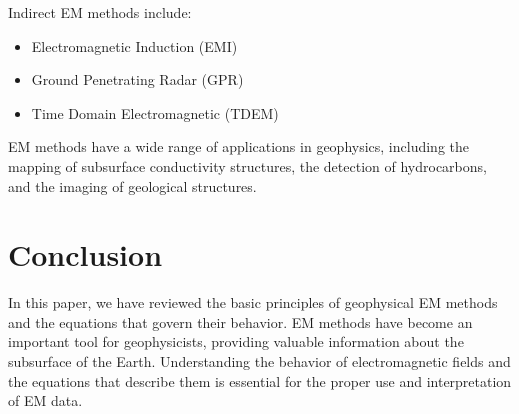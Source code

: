 \documentclass{article}
\begin{document}
Indirect EM methods include:
\begin{itemize}
\item Electromagnetic Induction (EMI)
\item Ground Penetrating Radar (GPR)
\item Time Domain Electromagnetic (TDEM)
\end{itemize}

EM methods have a wide range of applications in geophysics, including the mapping of subsurface conductivity structures, the detection of hydrocarbons, and the imaging of geological structures.

\section{Conclusion}
In this paper, we have reviewed the basic principles of geophysical EM methods and the equations that govern their behavior. EM methods have become an important tool for geophysicists, providing valuable information about the subsurface of the Earth. Understanding the behavior of electromagnetic fields and the equations that describe them is essential for the proper use and interpretation of EM data.
\end{document}
